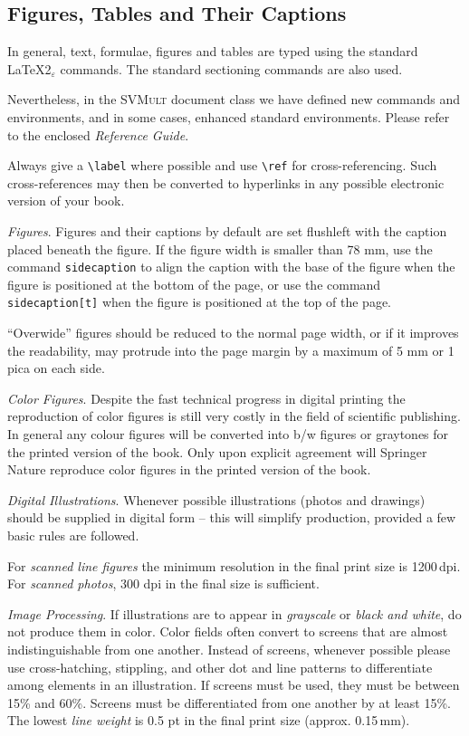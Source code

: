 \documentclass[graybox]{svmult}
\begin{document}
\begin{refguide}
\begin{sloppy}
\subsection{Figures, Tables and Their Captions}

In general, text, formulae, figures and tables are typed using the standard \LaTeX2$_\varepsilon$ commands. The standard sectioning commands are also used.

Nevertheless, in the \textsc{SVMult} document class we have defined new commands and environments, and in some cases, enhanced standard environments. Please refer to the enclosed \emph{Reference Guide}.

Always give a \verb|\label| where possible and use \verb|\ref| for cross-referencing. Such cross-references may then be converted to hyperlinks in any possible electronic version of your book.

\textit{Figures}. Figures and their captions by default are set flushleft with the caption placed beneath the figure. If the figure width is smaller than 78 mm, use the command
\texttt{sidecaption} to align the caption with the base of the figure when the figure is positioned at the bottom of the page, or use the command \texttt{sidecaption[t]} when the figure is positioned at the top of the page.

``Overwide'' figures should be reduced to the normal page width, or if it improves the readability, may protrude into the page margin by a maximum of 5 mm or 1 pica on each side.

\emph{Color Figures}. Despite the fast technical progress in digital printing the reproduction of color figures is still very costly in the field of scientific publishing. In general any colour figures will be converted into b/w figures or graytones for the printed version of the book. Only upon explicit agreement will Springer Nature reproduce color figures in the printed version of the book.

\emph{Digital Illustrations}. Whenever possible illustrations (photos and drawings) should be supplied in digital form -- this will simplify production, provided a few basic rules are followed.

For \emph{scanned line figures} the minimum resolution in the final print size is 1200\,dpi. For \emph{scanned photos}, 300 dpi in the final size is sufficient.

\emph{Image Processing}. If illustrations are to appear in \textit{grayscale} or \textit{black and white}, do not produce them in color. Color fields often convert to screens that are almost indistinguishable from one another. Instead of screens, whenever possible please use cross-hatching, stippling, and other dot and line patterns to differentiate among elements in an illustration. If screens must be used, they must be between 15\% and 60\%. Screens must be differentiated from one another by at least 15\%. The lowest \emph{line weight} is 0.5 pt in the final print size (approx. 0.15\,mm).


\end{sloppy}
\end{refguide}
\end{document}
